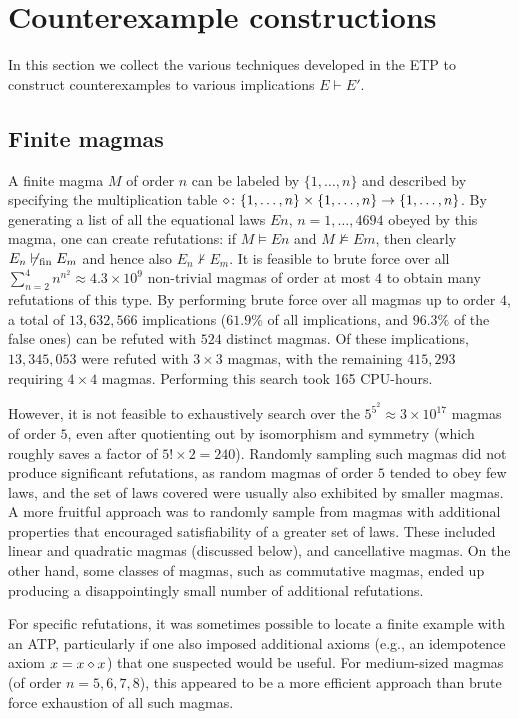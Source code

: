 
\section{Counterexample constructions}

In this section we collect the various techniques developed in the ETP to construct counterexamples to various implications $E \vdash E'$.

\subsection{Finite magmas}\label{finite-sec}

A finite magma $M$ of order $n$ can be labeled by $\{1,\dots,n\}$ and described by specifying the multiplication table $\diamond \colon \{1,\dots,n\} \times \{1,\dots,n\} \to \{1,\dots,n\}$.  By generating a list of all the equational laws $En$, $n=1,\dots,4694$ obeyed by this magma, one can create refutations: if $M \models En$ and $M \not \models Em$, then clearly $E_n \not \vdash_{\mathrm{fin}} E_m$ and hence also $E_n \not \vdash E_m$.  It is feasible to brute force over all $\sum_{n=2}^4 n^{n^2} \approx 4.3 \times 10^9$ non-trivial magmas of order at most $4$ to obtain many refutations of this type.
By performing brute force over all magmas up to order $4$, a total of $13,632,566$ implications ($61.9\%$ of all implications, and $96.3\%$ of the false ones) can be refuted with $524$ distinct magmas. Of these implications, $13,345,053$ were refuted with $3 \times 3$ magmas, with the remaining $415,293$ requiring $4 \times 4$ magmas. Performing this search took 165 CPU-hours.

However, it is not feasible to exhaustively search over the $5^{5^2} \approx 3 \times 10^{17}$ magmas of order $5$, even after quotienting out by isomorphism and symmetry (which roughly saves a factor of $5! \times 2 = 240$).  Randomly sampling such magmas did not produce significant refutations, as random magmas of order $5$ tended to obey few laws, and the set of laws covered were usually also exhibited by smaller magmas.  A more fruitful approach was to randomly sample from magmas with additional properties that encouraged satisfiability of a greater set of laws.  These included linear and quadratic magmas (discussed below), and cancellative magmas.  On the other hand, some classes of magmas, such as commutative magmas, ended up producing a disappointingly small number of additional refutations.

For specific refutations, it was sometimes possible to locate a finite example with an ATP, particularly if one also imposed additional axioms (e.g., an idempotence axiom $x = x \diamond x$) that one suspected would be useful.  For medium-sized magmas (of order $n=5,6,7,8$), this appeared to be a more efficient approach than brute force exhaustion of all such magmas.

